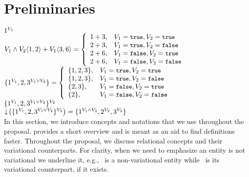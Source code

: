 \section{Preliminaries}
\label{sec:prelim}

$1^{\vOne}$
\\

$\chc [\vOne \wedge \vTwo] {1,2} + \chc [\vOne] {3,6} 
= \left\{ \begin{array}{rl}
1+3, & \vOne = \t, \vTwo = \t\\
2+3, & \vOne = \t, \vTwo = \f\\
2+6, & \vOne = \f, \vTwo = \t\\
2+6, & \vOne = \f, \vTwo = \f
\end{array} \right.
$
\\

$\{1^{\vOne}, 2, 3^{\vOne \vee \vTwo} \}
=\left\{ \begin{array} {ll}
\{1,2,3\}, & \vOne = \t, \vTwo = \t\\
\{1,2,3\}, & \vOne = \t, \vTwo = \f\\
\{2,3\}, & \vOne = \f, \vTwo = \t\\
\{2\}, & \vOne = \f, \vTwo = \f
\end{array} \right.
$
\\

$\{1^{\vOne}, 2, 3^{\vOne \vee \vTwo} \}^{\vTwo}$
\\

$\pushIn {\{1^{\vOne}, 2, 3^{\vOne \vee \vTwo} \}^{\vTwo}} = 
\{1^{\vOne \wedge \vTwo}, 2^{\vTwo}, 3^{\vTwo} \}$
\\

In this section, we introduce concepts and notations that we use
throughout the proposal.  
provides a short overview 
and is meant as an aid to find definitions
faster.
Throughout the proposal, we discuss relational concepts and their
variational counterparts. For clarity, when we need to emphasize 
an entity is not variational we underline it, e.g., \pElem\ is a 
non-variational entity while \elem\ is its variational counterpart,
if it exists.

